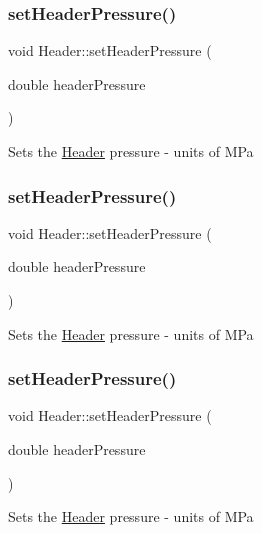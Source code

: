 \subsubsection{\texorpdfstring{set\+Header\+Pressure()}{setHeaderPressure()}\hspace{0.1cm}{\footnotesize\ttfamily [1/3]}}
{\footnotesize\ttfamily void Header\+::set\+Header\+Pressure (\begin{DoxyParamCaption}\item[{double}]{header\+Pressure }\end{DoxyParamCaption})}

Sets the \hyperlink{class_header}{Header} pressure -\/ units of M\+Pa \mbox{\label{class_header_a3af0b7964b74287ce0c662b9a88556ed}} 
\subsubsection{\texorpdfstring{set\+Header\+Pressure()}{setHeaderPressure()}\hspace{0.1cm}{\footnotesize\ttfamily [2/3]}}
{\footnotesize\ttfamily void Header\+::set\+Header\+Pressure (\begin{DoxyParamCaption}\item[{double}]{header\+Pressure }\end{DoxyParamCaption})}

Sets the \hyperlink{class_header}{Header} pressure -\/ units of M\+Pa \mbox{\label{class_header_a3af0b7964b74287ce0c662b9a88556ed}} 
\subsubsection{\texorpdfstring{set\+Header\+Pressure()}{setHeaderPressure()}\hspace{0.1cm}{\footnotesize\ttfamily [3/3]}}
{\footnotesize\ttfamily void Header\+::set\+Header\+Pressure (\begin{DoxyParamCaption}\item[{double}]{header\+Pressure }\end{DoxyParamCaption})}

Sets the \hyperlink{class_header}{Header} pressure -\/ units of M\+Pa 

